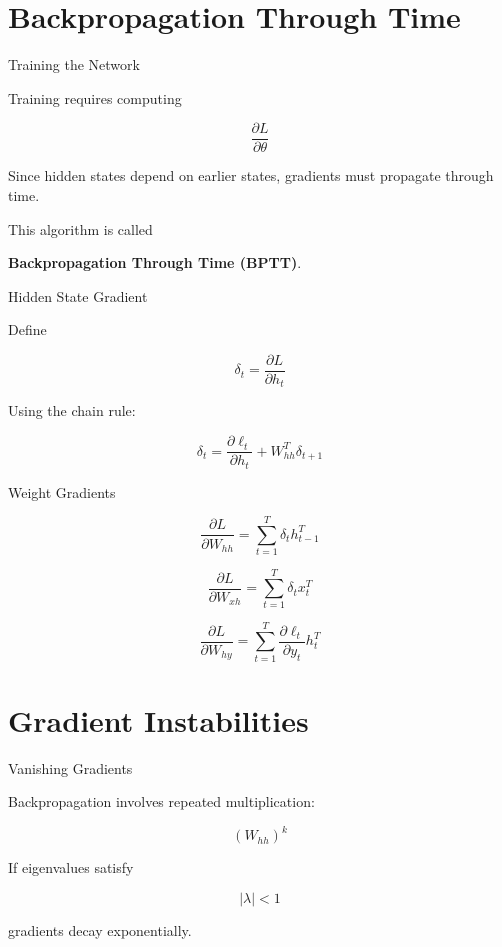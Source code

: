 \documentclass{beamer}
\begin{document}
\section{Backpropagation Through Time}

\begin{frame}{Training the Network}

Training requires computing

\[
\frac{\partial L}{\partial \theta}
\]

Since hidden states depend on earlier states, gradients must propagate through time.

This algorithm is called

\textbf{Backpropagation Through Time (BPTT)}.
\end{frame}

\begin{frame}{Hidden State Gradient}

Define

\[
\delta_t = \frac{\partial L}{\partial h_t}
\]

Using the chain rule:

\[
\delta_t =
\frac{\partial \ell_t}{\partial h_t}
+
W_{hh}^T\delta_{t+1}
\]
\end{frame}

\begin{frame}{Weight Gradients}

\[
\frac{\partial L}{\partial W_{hh}}
=
\sum_{t=1}^T \delta_t h_{t-1}^T
\]

\[
\frac{\partial L}{\partial W_{xh}}
=
\sum_{t=1}^T \delta_t x_t^T
\]

\[
\frac{\partial L}{\partial W_{hy}}
=
\sum_{t=1}^T
\frac{\partial \ell_t}{\partial y_t}
h_t^T
\]
\end{frame}

\section{Gradient Instabilities}

\begin{frame}{Vanishing Gradients}

Backpropagation involves repeated multiplication:

\[
(W_{hh})^k
\]

If eigenvalues satisfy

\[
|\lambda| < 1
\]

gradients decay exponentially.
\end{frame}
\end{document}
